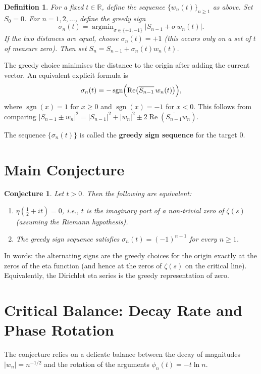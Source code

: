 \documentclass[12pt,a4paper]{article}
\newtheorem{definition}{Definition}[section]
\newtheorem{conjecture}{Conjecture}[section]
\begin{document}
\begin{definition}
For a fixed $t\in\mathbb{R}$, define the sequence $\{w_n(t)\}_{n\ge1}$ as above. Set $S_0=0$. For $n=1,2,\dots$, define the greedy sign
\[
\sigma_n(t)=\operatorname{argmin}_{\sigma\in\{+1,-1\}}\bigl|S_{n-1}+\sigma\,w_n(t)\bigr|.
\]
If the two distances are equal, choose $\sigma_n(t)=+1$ (this occurs only on a set of $t$ of measure zero). Then set $S_n=S_{n-1}+\sigma_n(t)w_n(t)$.
\end{definition}

The greedy choice minimises the distance to the origin after adding the current vector. An equivalent explicit formula is
\[
\sigma_n(t)=-\operatorname{sgn}\Bigl(\operatorname{Re}\bigl(\overline{S_{n-1}}\,w_n(t)\bigr)\Bigr),
\]
where $\operatorname{sgn}(x)=1$ for $x\ge0$ and $\operatorname{sgn}(x)=-1$ for $x<0$. This follows from comparing $|S_{n-1}\pm w_n|^2=|S_{n-1}|^2+|w_n|^2\pm2\operatorname{Re}(\overline{S_{n-1}}w_n)$.

The sequence $\{\sigma_n(t)\}$ is called the \textbf{greedy sign sequence} for the target $0$.

\section{Main Conjecture}

\begin{conjecture}
Let $t>0$. Then the following are equivalent:
\begin{enumerate}
    \item $\eta(\frac12+it)=0$, i.e., $t$ is the imaginary part of a non‑trivial zero of $\zeta(s)$ (assuming the Riemann hypothesis).
    \item The greedy sign sequence satisfies $\sigma_n(t)=(-1)^{n-1}$ for every $n\ge1$.
\end{enumerate}
\end{conjecture}

In words: the alternating signs are the greedy choices for the origin exactly at the zeros of the eta function (and hence at the zeros of $\zeta(s)$ on the critical line). Equivalently, the Dirichlet eta series is the greedy representation of zero.

\section{Critical Balance: Decay Rate and Phase Rotation}

The conjecture relies on a delicate balance between the decay of magnitudes $|w_n|=n^{-1/2}$ and the rotation of the arguments $\phi_n(t)=-t\ln n$.
\end{document}
